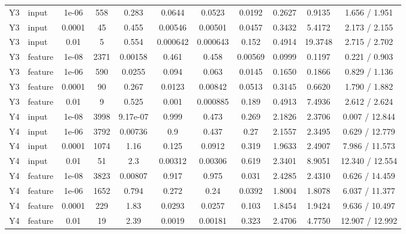 \begin{tabular}{llccccccccc}
Y3 & input & 1e-06 & 558 & 0.283 & 0.0644 & 0.0523 & 0.0192 & 0.2627 & 0.9135 & 1.656 / 1.951 \\
Y3 & input & 0.0001 & 45 & 0.455 & 0.00546 & 0.00501 & 0.0457 & 0.3432 & 5.4172 & 2.173 / 2.155 \\
Y3 & input & 0.01 & 5 & 0.554 & 0.000642 & 0.000643 & 0.152 & 0.4914 & 19.3748 & 2.715 / 2.702 \\
Y3 & feature & 1e-08 & 2371 & 0.00158 & 0.461 & 0.458 & 0.00569 & 0.0999 & 0.1197 & 0.221 / 0.903 \\
Y3 & feature & 1e-06 & 590 & 0.0255 & 0.094 & 0.063 & 0.0145 & 0.1650 & 0.1866 & 0.829 / 1.136 \\
Y3 & feature & 0.0001 & 90 & 0.267 & 0.0123 & 0.00842 & 0.0513 & 0.3145 & 0.6620 & 1.790 / 1.882 \\
Y3 & feature & 0.01 & 9 & 0.525 & 0.001 & 0.000885 & 0.189 & 0.4913 & 7.4936 & 2.612 / 2.624 \\
Y4 & input & 1e-08 & 3998 & 9.17e-07 & 0.999 & 0.473 & 0.269 & 2.1826 & 2.3706 & 0.007 / 12.844 \\
Y4 & input & 1e-06 & 3792 & 0.00736 & 0.9 & 0.437 & 0.27 & 2.1557 & 2.3495 & 0.629 / 12.779 \\
Y4 & input & 0.0001 & 1074 & 1.16 & 0.125 & 0.0912 & 0.319 & 1.9633 & 2.4907 & 7.986 / 11.573 \\
Y4 & input & 0.01 & 51 & 2.3 & 0.00312 & 0.00306 & 0.619 & 2.3401 & 8.9051 & 12.340 / 12.554 \\
Y4 & feature & 1e-08 & 3823 & 0.00807 & 0.917 & 0.975 & 0.031 & 2.4285 & 2.4310 & 0.626 / 14.459 \\
Y4 & feature & 1e-06 & 1652 & 0.794 & 0.272 & 0.24 & 0.0392 & 1.8004 & 1.8078 & 6.037 / 11.377 \\
Y4 & feature & 0.0001 & 229 & 1.83 & 0.0293 & 0.0257 & 0.103 & 1.8454 & 1.9424 & 9.636 / 10.497 \\
Y4 & feature & 0.01 & 19 & 2.39 & 0.0019 & 0.00181 & 0.323 & 2.4706 & 4.7750 & 12.907 / 12.992 \\
\bottomrule
\end{tabular}

